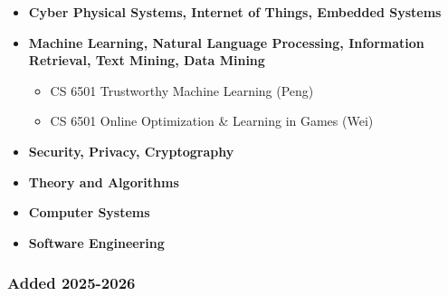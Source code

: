 \begin{itemize}[nosep]

	\item \textbf{Cyber Physical Systems, Internet of Things, Embedded Systems}

	\item \textbf{Machine Learning, Natural Language Processing, Information Retrieval, Text Mining, Data Mining}
	\begin{itemize}[nosep]
		\item CS 6501 Trustworthy Machine Learning (Peng)
		\item CS 6501 Online Optimization \& Learning in Games (Wei)
	\end{itemize}

	\item \textbf{Security, Privacy, Cryptography}

	\item \textbf{Theory and Algorithms}

	\item \textbf{Computer Systems}

	\item \textbf{Software Engineering}

\end{itemize}


\subsubsection{Added 2025-2026}

